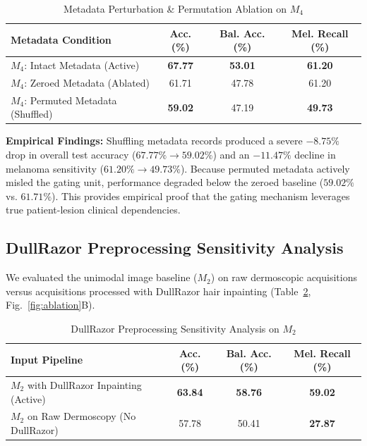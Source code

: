 \documentclass[journal,10pt,twocolumn]{IEEEtran}
\begin{document}
\begin{table}[ht]
\centering
\caption{Metadata Perturbation \& Permutation Ablation on $M_4$}
\label{tab:ablation}
\begin{tabular}{lccc}
\toprule
\textbf{Metadata Condition} & \textbf{Acc. (\%)} & \textbf{Bal. Acc. (\%)} & \textbf{Mel. Recall (\%)} \\
\midrule
$M_4$: Intact Metadata (Active)      & \textbf{67.77} & \textbf{53.01} & \textbf{61.20} \\
$M_4$: Zeroed Metadata (Ablated)     & 61.71 & 47.78 & 61.20 \\
$M_4$: Permuted Metadata (Shuffled)  & \textbf{59.02} & 47.19 & \textbf{49.73} \\
\bottomrule
\end{tabular}
\end{table}

\textbf{Empirical Findings:} Shuffling metadata records produced a severe $-8.75\%$ drop in overall test accuracy ($67.77\% \to 59.02\%$) and an $-11.47\%$ decline in melanoma sensitivity ($61.20\% \to 49.73\%$). Because permuted metadata actively misled the gating unit, performance degraded below the zeroed baseline ($59.02\%$ vs. $61.71\%$). This provides empirical proof that the gating mechanism leverages true patient-lesion clinical dependencies.

\subsection{DullRazor Preprocessing Sensitivity Analysis}
We evaluated the unimodal image baseline ($M_2$) on raw dermoscopic acquisitions versus acquisitions processed with DullRazor hair inpainting (Table~\ref{tab:dullrazor}, Fig.~\ref{fig:ablation}B).

\begin{table}[ht]
\centering
\caption{DullRazor Preprocessing Sensitivity Analysis on $M_2$}
\label{tab:dullrazor}
\begin{tabular}{lccc}
\toprule
\textbf{Input Pipeline} & \textbf{Acc. (\%)} & \textbf{Bal. Acc. (\%)} & \textbf{Mel. Recall (\%)} \\
\midrule
$M_2$ with DullRazor Inpainting (Active) & \textbf{63.84} & \textbf{58.76} & \textbf{59.02} \\
$M_2$ on Raw Dermoscopy (No DullRazor)   & 57.78 & 50.41 & \textbf{27.87} \\
\bottomrule
\end{tabular}
\end{table}
\end{document}
